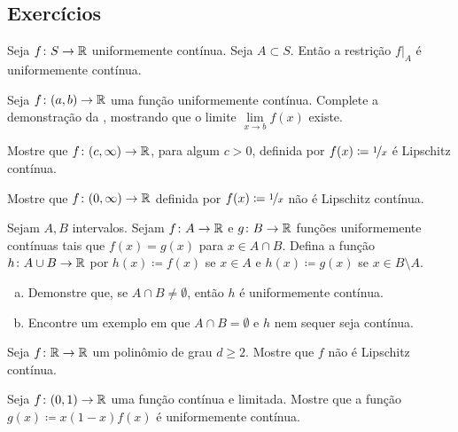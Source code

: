 \subsection{Exercícios}

\begin{exercise}
Seja $f \colon S \to {\mathbb{R}}$ uniformemente contínua. Seja $A \subset S$.
Então a restrição $f|_A$ é uniformemente contínua.
\end{exercise}

\begin{exercise}
Seja $f \colon (a,b) \to {\mathbb{R}}$ uma função uniformemente contínua.
Complete a demonstração da , mostrando que
o limite $\lim\limits_{x \to b} f(x)$ existe.
\end{exercise}

\begin{exercise}
Mostre que $f \colon (c,\infty) \to {\mathbb{R}}$, para algum $c > 0$,
definida por $f(x) \coloneqq \nicefrac{1}{x}$ é Lipschitz contínua.
\end{exercise}

\begin{exercise}
Mostre que $f \colon (0,\infty) \to {\mathbb{R}}$
definida por $f(x) \coloneqq \nicefrac{1}{x}$ não é Lipschitz contínua.
\end{exercise}

\begin{samepage}
\begin{exercise}
Sejam $A,B$ intervalos.
Sejam $f \colon A \to {\mathbb{R}}$ e $g \colon B \to {\mathbb{R}}$ funções uniformemente contínuas
tais que $f(x) = g(x)$ para $x \in A \cap B$. Defina
a função $h \colon A \cup B \to {\mathbb{R}}$ por $h(x) \coloneqq f(x)$ se
$x \in A$ e $h(x) \coloneqq g(x)$ se $x \in B \setminus A$.
\begin{enumerate}[a)]
\item
Demonstre que, se $A \cap B \neq \emptyset$, então $h$ é uniformemente contínua.
\item
Encontre um exemplo em que $A \cap B = \emptyset$ e $h$ nem sequer
seja contínua.
\end{enumerate}
\end{exercise}
\end{samepage}

\begin{exercise}[Desafiador]
Seja $f \colon {\mathbb{R}} \to {\mathbb{R}}$ um polinômio de grau
$d \geq 2$. Mostre que $f$ não é Lipschitz contínua.
\end{exercise}

\begin{exercise}
Seja $f \colon (0,1) \to {\mathbb{R}}$ uma função contínua e limitada. Mostre que
a função $g(x) \coloneqq x(1-x)f(x)$ é uniformemente contínua.
\end{exercise}

